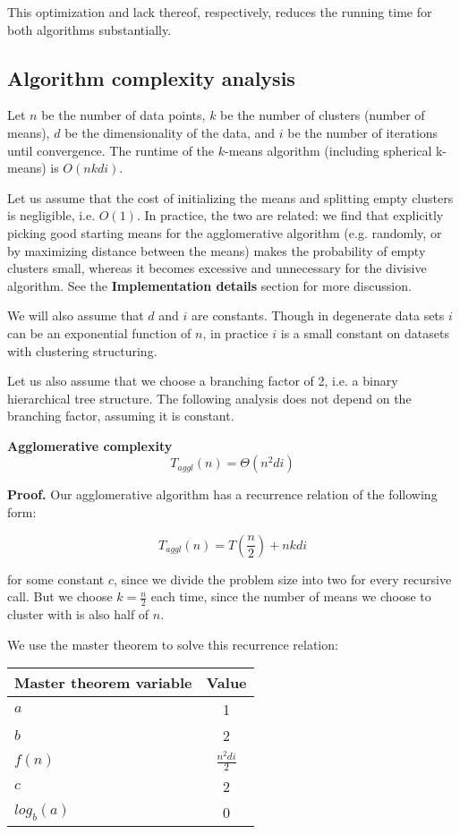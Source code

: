 \documentclass[../tech_report_1.tex]{subfiles}
\begin{document}
This optimization and lack thereof, respectively, reduces the running time for both algorithms substantially.

\subsection{Algorithm complexity analysis}

Let $n$ be the number of data points, $k$ be the number of clusters (number of means), $d$ be the dimensionality of the data, and $i$ be the number of iterations until convergence. The runtime of the $k$-means algorithm (including spherical k-means) is $O(nkdi)$.

Let us assume that the cost of initializing the means and splitting empty clusters is negligible, i.e. $O(1)$. In practice, the two are related: we find that explicitly picking good starting means for the agglomerative algorithm (e.g. randomly, or by maximizing distance between the means) makes the probability of empty clusters small, whereas it becomes excessive and unnecessary for the divisive algorithm. See the \textbf{Implementation details} section for more discussion.

We will also assume that $d$ and $i$ are constants. Though in degenerate data sets $i$ can be an exponential function of $n$, in practice $i$ is a small constant on datasets with clustering structuring.

Let us also assume that we choose a branching factor of 2, i.e. a binary hierarchical tree structure. The following analysis does not depend on the branching factor, assuming it is constant.

\begin{theorem}

\textbf{Agglomerative complexity} $$T_{aggl}(n) = \Theta(n^2di)$$

\end{theorem}

\textbf{Proof.} Our agglomerative algorithm has a recurrence relation of the following form:

$$ T_{aggl}(n) = T(\frac{n}{2}) + nkdi $$

for some constant $c$, since we divide the problem size into two for every recursive call. But we choose $k=\frac{n}{2}$ each time, since the number of means we choose to cluster with is also half of $n$.

We use the master theorem \cite{thomas2001introduction} to solve this recurrence relation:

\begin{table}[ht]
\centering
\begin{tabular}{l || c }
\hline
\textbf{Master theorem variable} & \textbf{Value} \\
\hline
$a$ & 1 \\
$b$ & 2 \\
$f(n)$ & $\frac{n^2di}{2}$ \\
$c$ & 2 \\
$log_b(a)$ & 0 \\
\hline
\end{tabular}
\end{table}
\end{document}
